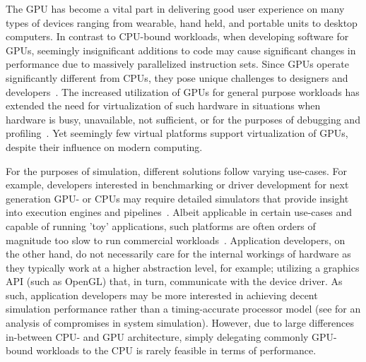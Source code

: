 The GPU has become a vital part in delivering good user experience on many types of devices ranging from wearable, hand held, and portable units to desktop computers.
In contrast to CPU-bound workloads, when developing software for GPUs, seemingly insignificant additions to code may cause significant changes in performance due to massively parallelized instruction sets.
Since GPUs operate significantly different from CPUs, they pose unique challenges to designers and developers~.
The increased utilization of GPUs for general purpose workloads has extended the need for virtualization of such hardware in situations when hardware is busy, unavailable, not sufficient, or for the purposes of debugging and profiling~.
Yet seemingly few virtual platforms support virtualization of GPUs, despite their influence on modern computing.

For the purposes of simulation, different solutions follow varying use-cases. For example, developers interested in benchmarking or driver development for next generation GPU- or CPUs may require detailed simulators that provide insight into execution engines and pipelines~.
Albeit applicable in certain use-cases and capable of running 'toy' applications, such platforms are often orders of magnitude too slow to run commercial workloads~.
Application developers, on the other hand, do not necessarily care for the internal workings of hardware as they typically work at a higher abstraction level, for example; utilizing a graphics API (such as OpenGL) that, in turn, communicate with the device driver.
As such, application developers may be more interested in achieving decent simulation performance rather than a timing-accurate processor model (see  for an analysis of compromises in system simulation).
However, due to large differences in-between CPU- and GPU architecture, simply delegating commonly GPU-bound workloads to the CPU is rarely feasible in terms of performance.

